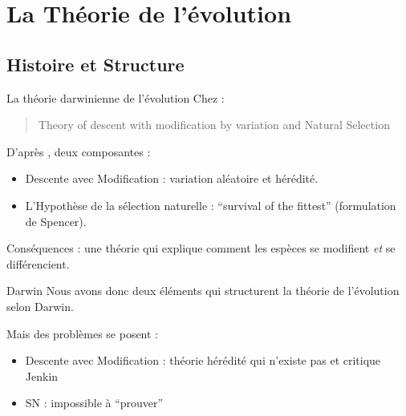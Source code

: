 \documentclass[8pt, handout=show,notes=show]{beamer}
\begin{document}
\section{La Théorie de l'évolution}

\subsection{Histoire et Structure}
\begin{frame}{La théorie darwinienne de l'évolution}
	Chez \cite{darwin1859originspeciesbymeansnaturalselectionorpreservationfavouredracesstrugglelife}:
	\begin{quote}
		Theory of descent with modification by variation and Natural Selection
	\end{quote}

	\vfill

	D'après \cite{gayon1991darwinetlapresdarwin}, deux composantes :
	\begin{itemize}
		\item Descente avec Modification : variation aléatoire et hérédité.
		\item L'Hypothèse de la sélection naturelle : ``survival of the fittest'' (formulation de Spencer).
	\end{itemize}
	\vfill
	Conséquences : une théorie qui explique comment les espèces se modifient \emph{et} se différencient.
\end{frame}

\begin{frame}{Darwin}
	Nous avons donc deux éléments qui structurent la théorie de l'évolution selon Darwin.
	\vfill
	\begin{alertblock}{Mais des problèmes se posent :}

		\begin{itemize}
			\item Descente avec Modification : théorie hérédité  qui n'existe pas et critique Jenkin
			\item SN : impossible à ``prouver''
		\end{itemize}
	\end{alertblock}
\end{frame}
\end{document}
